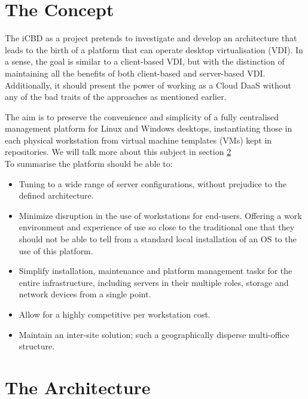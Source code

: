 \section{The Concept} %
\label{sec:icbd_concept}

The iCBD as a project pretends to investigate and develop an architecture that leads to the birth of a platform that can operate desktop virtualisation (\gls{VDI}). In a sense, the goal is similar to a client-based VDI, but with the distinction of maintaining all the benefits of both client-based and server-based VDI. Additionally, it should present the power of working as a Cloud \gls{DaaS} without any of the bad traits of the approaches as mentioned earlier.

The aim is to preserve the convenience and simplicity of a fully centralised management platform for Linux and Windows desktops, instantiating those in each physical workstation from virtual machine templates (VMs) kept in repositories. We will talk more about this subject in section \ref{sec:icbd_architecture}\\

To summarise the platform should be able to:

\begin{itemize}
	\item Tuning to a wide range of server configurations, without prejudice to the defined architecture.
	\item Minimize disruption in the use of workstations for end-users. Offering a work environment and experience of use so close to the traditional one that they should not be able to tell from a standard local installation of an \gls{OS} to the use of this platform.
	\item Simplify installation, maintenance and platform management tasks for the entire infrastructure, including servers in their multiple roles, storage and network devices from a single point.
	\item Allow for a highly competitive per workstation cost.
	\item Maintain an inter-site solution; such a geographically disperse multi-office structure.
\end{itemize}


\section{The Architecture} %
\label{sec:icbd_architecture}

